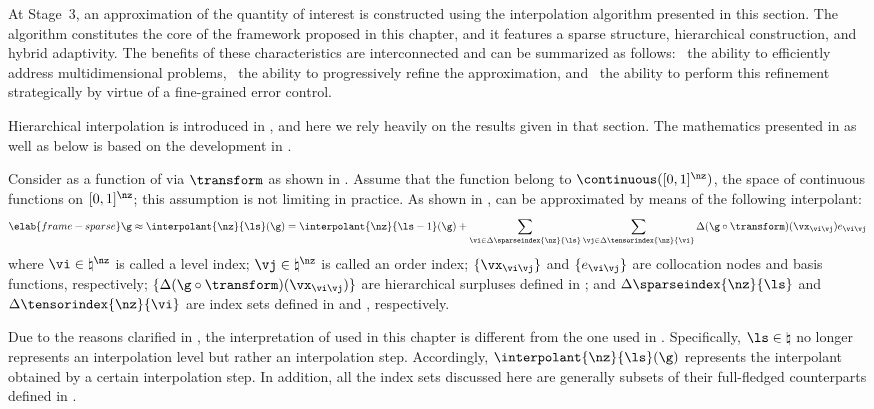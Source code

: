 At Stage~3, an approximation of the quantity of interest is constructed using
the interpolation algorithm presented in this section. The algorithm constitutes
the core of the framework proposed in this chapter, and it features a sparse
structure, hierarchical construction, and hybrid adaptivity. The benefits of
these characteristics are interconnected and can be summarized as follows:
\one~the ability to efficiently address multidimensional problems, \two~the
ability to progressively refine the approximation, and \three~the ability to
perform this refinement strategically by virtue of a fine-grained error control.

Hierarchical interpolation is introduced in , and
here we rely heavily on the results given in that section. The mathematics
presented in  as well as below is based on the
development in \cite{klimke2006, ma2009, jakeman2012}.

Consider \g as a function of \vz via $\transform$ as shown in
. Assume that the function belong to $\continuous([0,
1]^\nz)$, the space of continuous functions on $[0, 1]^\nz$; this assumption is
not limiting in practice. As shown in , \g can be
approximated by means of the following interpolant:
\begin{equation} \elab{frame-sparse}
  \g \approx \interpolant{\nz}{\ls}(\g)
  = \interpolant{\nz}{\ls - 1}(\g) + \sum_{\vi \in \Delta\sparseindex{\nz}{\ls}}
  \sum_{\vj \in \Delta\tensorindex{\nz}{\vi}} \Delta(\g \circ \transform)(\vx_{\vi \vj}) e_{\vi \vj} \end{equation}
where $\vi \in \natural^\nz$ is called a level index; $\vj \in \natural^\nz$ is
called an order index; $\{ \vx_{\vi \vj} \}$ and $\{ e_{\vi \vj} \}$ are
collocation nodes and basis functions, respectively; $\{ \Delta(\g \circ
\transform)(\vx_{\vi \vj}) \}$ are hierarchical surpluses defined in
; and $\Delta\sparseindex{\nz}{\ls}$ and
$\Delta\tensorindex{\nz}{\vi}$ are index sets defined in
 and ,
respectively.

Due to the reasons clarified in , the interpretation of
 used in this chapter is different from the one used in
. Specifically, $\ls \in \natural$ no longer
represents an interpolation level but rather an interpolation step. Accordingly,
$\interpolant{\nz}{\ls}(\g)$ represents the interpolant obtained by a certain
interpolation step. In addition, all the index sets discussed here are generally
subsets of their full-fledged counterparts defined in
.

